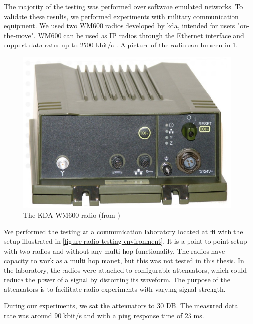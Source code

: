 The majority of the testing was performed over software emulated networks. To
validate these results, we performed experiments with military communication
equipment. We used two WM600 radios developed by \gls{kda}, intended for users
"on-the-move". WM600 can be used as IP radios through the Ethernet interface and
support data rates up to 2500 kbit/s \cite{kongsberg-wm600}. A picture of the
radio can be seen in \cref{figure-kdawm600}.

\begin{figure}[h]
\centering
\includegraphics[scale=0.2]{images/kda_wm600.jpg}
\caption{The KDA WM600 radio (from \cite{kongsberg-wm600})}
\label{figure-kdawm600}
\end{figure}

We performed the testing at a communication laboratory located at \gls{ffi} with
the setup illustrated in \cref{figure-radio-testing-environment}. It is a
point-to-point setup with two radios and without any multi hop functionality.
The radios have capacity to work as a multi hop \gls{manet}, but this was not
tested in this thesis. In the laboratory, the radios were attached to
configurable attenuators, which could reduce the power of a signal by distorting
its waveform. The purpose of the attenuators is to facilitate radio experiments
with varying signal strength.

During our experiments, we sat the attenuators to 30 DB. The measured data rate
was around 90 kbit/s and with a ping response time of 23 ms.

